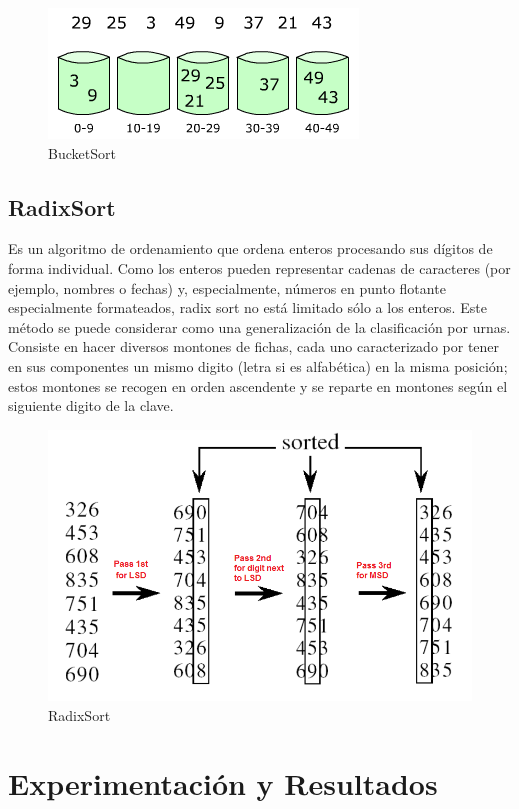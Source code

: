 \documentclass[12pt,twoside]{article}
\begin{document}
\begin{figure}[t]
  \includegraphics[height=0.25\textwidth]{Figure1}
  \centering
  \caption{BucketSort}
\end{figure}

\subsection{\textbf{RadixSort}}
\setlength{\parindent}{1.5em}Es un algoritmo de ordenamiento que ordena enteros procesando sus dígitos de forma individual. Como los enteros pueden representar cadenas de caracteres (por ejemplo, nombres o fechas) y, especialmente, números en 
punto flotante especialmente formateados, radix sort no está limitado sólo a los enteros.
Este método se puede considerar como una generalización de la clasificación por urnas.
Consiste en hacer diversos montones de fichas, cada uno caracterizado por tener en sus componentes un mismo digito (letra si es alfabética) en la misma posición; estos montones se recogen en orden ascendente y se reparte en montones según 
el siguiente digito de la clave.
\begin{figure}[t]
  \includegraphics[height=0.5\textwidth]{Figure2}
  \centering
  \caption{RadixSort}
\end{figure}

\newpage
\section{Experimentaci\'on y Resultados}
\centerline{}
\end{document}
